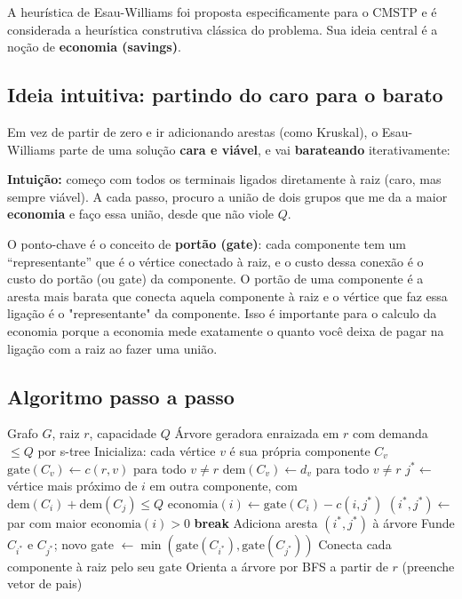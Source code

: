 \documentclass[12pt, a4paper]{article}
\begin{document}
A heurística de Esau-Williams \cite{esauwilliams1966} foi proposta especificamente para o CMSTP e é considerada a heurística construtiva clássica do problema. Sua ideia central é a noção de \textbf{economia (savings)}.

\subsection{Ideia intuitiva: partindo do caro para o barato}

Em vez de partir de zero e ir adicionando arestas (como Kruskal), o Esau-Williams parte de uma solução \textbf{cara e viável}, e vai \textbf{barateando} iterativamente:

\begin{mdframed}
\textbf{Intuição:} começo com todos os terminais ligados diretamente à raiz (caro, mas sempre viável). A cada passo, procuro a união de dois grupos que me da a maior \textbf{economia} e faço essa união, desde que não viole $Q$.
\end{mdframed}

O ponto-chave é o conceito de \textbf{portão (gate)}: cada componente tem um ``representante'' que é o vértice conectado à raiz, e o custo dessa conexão é o custo do portão (ou gate) da componente. O portão de uma componente é a aresta mais barata que conecta aquela componente à raiz e o vértice que faz essa ligação é o "representante" da componente. Isso é importante para o calculo da economia porque a economia mede exatamente o quanto você deixa de pagar na ligação com a raiz ao fazer uma união.

\subsection{Algoritmo passo a passo}

\begin{algorithm}[H]
\caption{Esau-Williams (construção gulosa)}
\label{alg:esau_williams}
\begin{algorithmic}[1]
\Require Grafo $G$, raiz $r$, capacidade $Q$
\Ensure Árvore geradora enraizada em $r$ com demanda $\leq Q$ por s-tree
\State Inicializa: cada vértice $v$ é sua própria componente $C_v$
\State $\text{gate}(C_v) \leftarrow c(r, v)$ para todo $v \neq r$ 
\State $\text{dem}(C_v) \leftarrow d_v$ para todo $v \neq r$
\Repeat
        \State $j^* \leftarrow$ vértice mais próximo de $i$ em outra componente, com $\text{dem}(C_i) + \text{dem}(C_{j}) \leq Q$
        \State $\text{economia}(i) \leftarrow \text{gate}(C_i) - c(i, j^*)$
    \EndFor
    \State $(i^*, j^*) \leftarrow$ par com maior $\text{economia}(i) > 0$
        \State \textbf{break}
    \EndIf
    \State Adiciona aresta $(i^*, j^*)$ à árvore
    \State Funde $C_{i^*}$ e $C_{j^*}$; novo gate $\leftarrow \min(\text{gate}(C_{i^*}), \text{gate}(C_{j^*}))$
\State Conecta cada componente à raiz pelo seu gate
\State Orienta a árvore por BFS a partir de $r$ (preenche vetor de pais)
\end{algorithmic}
\end{algorithm}
\end{document}
